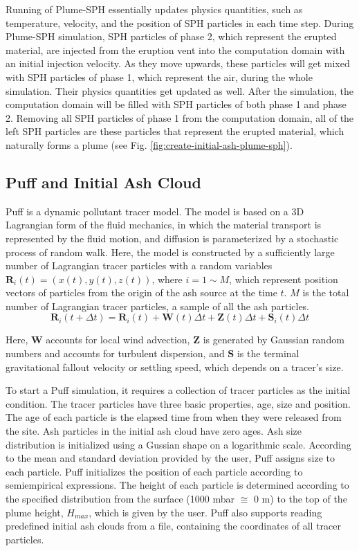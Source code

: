 \documentclass[utf8]{frontiersSCNS} %
\begin{document}
Running of Plume-SPH essentially updates physics quantities, such as temperature, velocity, and the position of SPH particles in each time step. During Plume-SPH simulation, SPH particles of phase 2, which represent the erupted material, are injected from the eruption vent into the computation domain with an initial injection velocity. As they move upwards, these particles will get mixed with SPH particles of phase 1, which represent the air, during the whole simulation. Their physics quantities get updated as well. After the simulation, the computation domain will be filled with SPH particles of both phase 1 and phase 2. Removing all SPH particles of phase 1 from the computation domain, all of the left SPH particles are these particles that represent the erupted material, which naturally forms a plume (see  Fig. \ref{fig:create-initial-ash-plume-sph}). 

\subsection{Puff and Initial Ash Cloud} \label{sec:puff-model}
Puff \citep{tanaka1991development,searcy1998puff} is a dynamic pollutant tracer model. The model is based on a 3D Lagrangian form of the fluid mechanics, in which the material transport is represented by the fluid motion, and diffusion is parameterized by a stochastic process of random walk. Here, the model is constructed by a sufficiently large number of  Lagrangian tracer particles with a random variables $\textbf{R}_i(t) = (x(t),y(t),z(t))$, where $ i = \mbox{1} \sim M$, which represent position vectors of particles from the origin of the ash source at the time $t$. $M$ is the total number of  Lagrangian tracer particles, a sample of all the ash particles.
\begin{equation}
\textbf{R}_i(t+\Delta t) = \textbf{R}_i(t) + \textbf{W}(t)\Delta t + \textbf{Z}(t)\Delta t + \textbf{S}_i(t) \Delta t
\label{eq:puff-model}
\end{equation}

Here, $\textbf{W}$ accounts for local wind advection, $\textbf{Z}$  is generated by Gaussian random numbers and accounts for turbulent dispersion, and $\textbf{S}$ is the terminal gravitational fallout velocity or settling speed, which depends on a tracer's size.

To start a Puff simulation, it requires a collection of tracer particles as the initial condition. The tracer particles have three basic properties, age, size and position. The age of each particle is the elapsed time from when they were released from the site. Ash particles in the initial ash cloud have zero ages. Ash size distribution is initialized using a Gussian shape on a logarithmic scale. According to the mean and standard deviation provided by the user, Puff assigns size to each particle. Puff initializes the position of each particle according to semiempirical expressions. The height of each particle is determined according to the specified distribution from the surface (1000 mbar $\cong$ 0 m) to the top of the plume height, $H_{max}$, which is given by the user. Puff also supports reading predefined initial ash clouds from a file, containing the coordinates of all tracer particles.
\end{document}
